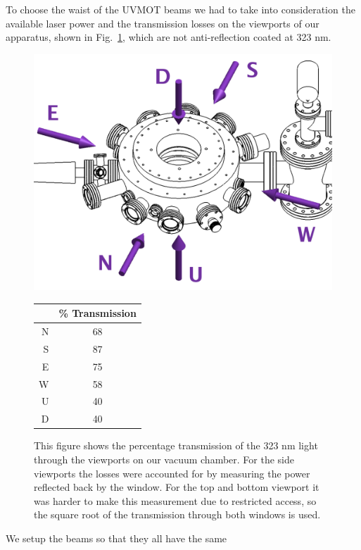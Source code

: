 \documentclass[oneside,12pt]{memoir}
\begin{document}
To choose the waist of  the UVMOT beams we had to take into consideration the
available laser power and the transmission losses on the viewports of our
apparatus, shown in Fig.~\ref{fig:012}, which are not anti-reflection coated at
323 nm.  \begin{figure} \begin{minipage}{0.5\linewidth}
\includegraphics[width=\textwidth]{../figures/323setup/losses/losses.pdf}
\end{minipage} \begin{minipage}{0.5\linewidth} \centering \begin{tabular}{r|c}
& \% Transmission  \\ \hline N & 68 \\ S & 87 \\ E & 75 \\ W & 58 \\ U & 40 \\
D & 40 \\ \end{tabular} \end{minipage} \caption[UVMOT Losses on windows]{\small
This figure shows the percentage transmission of the 323 nm light through the
viewports on our vacuum chamber.  For the side viewports the losses were
accounted for by measuring the power reflected back by the window.  For the top
and bottom viewport it was harder to make this measurement due to restricted
access, so the square root of the transmission through both windows is used. }
\label{fig:012} \end{figure} We setup the beams so that they all have the same
\end{document}
